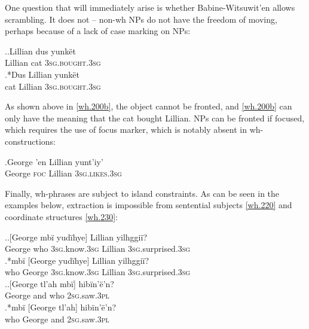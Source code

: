 \documentclass{glossa}
\begin{document}
One question that will immediately arise is whether Babine-Witsuwit'en allows scrambling. It does not -- non-wh NPs do not have the freedom of moving, perhaps because of a lack of case marking on NPs:

\ex.\ag.\label{wh.200a}Lillian dus yunk\"et\\
   Lillian cat \textsc{3sg.bought.3sg}\\
   \bg.*\label{wh.200b}Dus Lillian yunk\"et\\
   cat Lillian \textsc{3sg.bought.3sg}\\

As shown above in \ref{wh.200b}, the object cannot be fronted, and \ref{wh.200b} can only have the meaning that the cat bought Lillian. NPs can be fronted if focused, which requires the use of focus marker, which is notably absent in wh-constructions:

\exg.\label{wh.210}George 'en Lillian yunt'iy'\\
   George \textsc{foc} Lillian \textsc{3sg.likes.3sg}\\

Finally, wh-phrases are subject to island constraints. As can be seen in the examples below, extraction is impossible from sentential subjects \ref{wh.220} and coordinate structures \ref{wh.230}:

\ex.\label{wh.220}\ag.{}[George mb\"i yud\"ihye] Lillian yilhggi\"i?\\
   George who \textsc{3sg}.know.\textsc{3sg} Lillian \textsc{3sg}.surprised.\textsc{3sg}\\
   \bg.*mb\"i [George yud\"ihye] Lillian yilhggi\"i?\\
   who George \textsc{3sg}.know.\textsc{3sg} Lillian \textsc{3sg}.surprised.\textsc{3sg}\\

\ex.\label{wh.230}\ag.{}[George tl'ah mb\"i] hib\"in'\"e'n?\\
   George and who \textsc{2sg}.saw.\textsc{3pl}\\
   \bg.*mb\"i [George tl'ah] hib\"in'\"e'n?\\
   who George and \textsc{2sg}.saw.\textsc{3pl}\\
\end{document}
